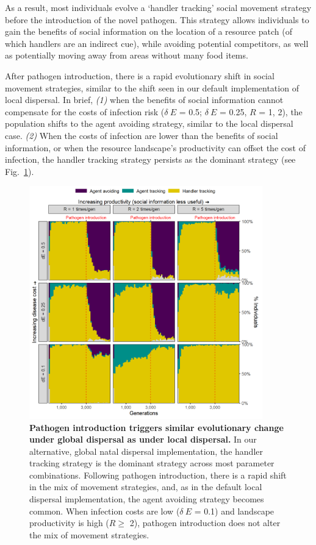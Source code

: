 As a result, most individuals evolve a `handler tracking' social movement strategy before the introduction of the novel pathogen.
This strategy allows individuals to gain the benefits of social information on the location of a resource patch (of which handlers are an indirect cue), while avoiding potential competitors, as well as potentially moving away from areas without many food items.

After pathogen introduction, there is a rapid evolutionary shift in social movement strategies, similar to the shift seen in our default implementation of local dispersal.
In brief, \emph{(1)} when the benefits of social information cannot compensate for the costs of infection risk ($\delta~E$ = 0.5; $\delta~E$ = 0.25, $R$ = 1, 2), the population shifts to the agent avoiding strategy, similar to the local dispersal case. \emph{(2)} When the costs of infection are lower than the benefits of social information, or when the resource landscape's productivity can offset the cost of infection, the handler tracking strategy persists as the dominant strategy (see Fig.~\ref{fig:patho_evo_global}).

\begin{figure}
    \centering
    \includegraphics[width=0.9\textwidth]{figures/pathomove/fig_evo_change_global_dispersal.png}
    \caption{
        \textbf{Pathogen introduction triggers similar evolutionary change under global dispersal as under local dispersal.} 
        In our alternative, global natal dispersal implementation, the handler tracking strategy is the dominant strategy across most parameter combinations. 
        Following pathogen introduction, there is a rapid shift in the mix of movement strategies, and, as in the default local dispersal implementation, the agent avoiding strategy becomes common. 
        When infection costs are low ($\delta~E$ = 0.1) and landscape productivity is high ($R \geq$ 2), pathogen introduction does not alter the mix of movement strategies.}
    \label{fig:patho_evo_global}
\end{figure}

